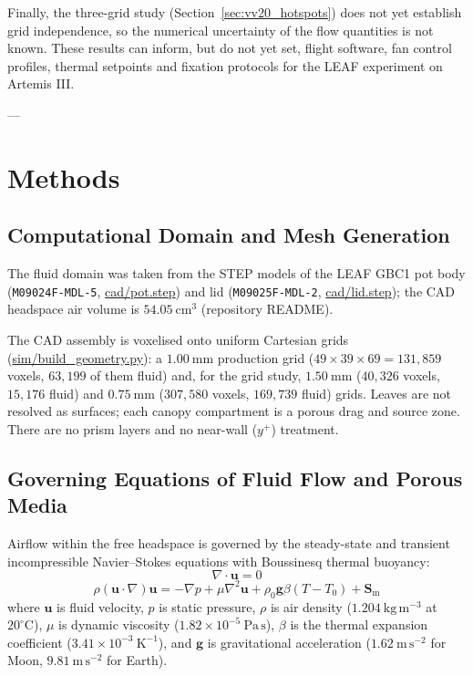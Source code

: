 \documentclass[pdflatex,sn-nature,iicol]{sn-jnl}
\begin{document}
Finally, the three-grid study (Section~\ref{sec:vv20_hotspots}) does not yet establish grid independence, so the numerical uncertainty of the flow quantities is not known. These results can inform, but do not yet set, flight software, fan control profiles, thermal setpoints and fixation protocols for the LEAF experiment on Artemis III.

---

\section{Methods}\label{sec:methods}

\subsection{Computational Domain and Mesh Generation}\label{sec:mesh_meth}

The fluid domain was taken from the STEP models of the LEAF GBC1 pot body (\texttt{M09024F-MDL-5}, \url{cad/pot.step}) and lid (\texttt{M09025F-MDL-2}, \url{cad/lid.step}); the CAD headspace air volume is $54.05\ \mathrm{cm^3}$ (repository README).

The CAD assembly is voxelised onto uniform Cartesian grids (\url{sim/build_geometry.py}): a $1.00\ \mathrm{mm}$ production grid ($49 \times 39 \times 69 = 131{,}859$ voxels, $63{,}199$ of them fluid) and, for the grid study, $1.50\ \mathrm{mm}$ ($40{,}326$ voxels, $15{,}176$ fluid) and $0.75\ \mathrm{mm}$ ($307{,}580$ voxels, $169{,}739$ fluid) grids. Leaves are not resolved as surfaces; each canopy compartment is a porous drag and source zone. There are no prism layers and no near-wall ($y^+$) treatment.

\subsection{Governing Equations of Fluid Flow and Porous Media}\label{sec:navier_meth}

Airflow within the free headspace is governed by the steady-state and transient incompressible Navier--Stokes equations with Boussinesq thermal buoyancy:
\begin{equation}
\nabla \cdot \mathbf{u} = 0
\label{eq:continuity}
\end{equation}
\begin{equation}
\rho (\mathbf{u} \cdot \nabla) \mathbf{u} = -\nabla p + \mu \nabla^2 \mathbf{u} + \rho_0 \mathbf{g} \beta (T - T_0) + \mathbf{S}_{\mathrm{m}}
\label{eq:navier_stokes}
\end{equation}
where $\mathbf{u}$ is fluid velocity, $p$ is static pressure, $\rho$ is air density ($1.204\ \mathrm{kg\,m^{-3}}$ at $20^\circ\mathrm{C}$), $\mu$ is dynamic viscosity ($1.82 \times 10^{-5}\ \mathrm{Pa\,s}$), $\beta$ is the thermal expansion coefficient ($3.41 \times 10^{-3}\ \mathrm{K^{-1}}$), and $\mathbf{g}$ is gravitational acceleration ($1.62\ \mathrm{m\,s^{-2}}$ for Moon, $9.81\ \mathrm{m\,s^{-2}}$ for Earth).
\end{document}
